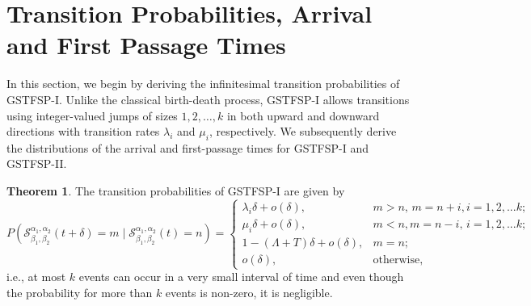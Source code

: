 \documentclass[11pt,oneside,reqno]{amsart}
\theoremstyle{definition}
\newtheorem{theorem}{\bf Theorem}[section]
\theoremstyle{remarkstyle}
\begin{document}
\section{Transition Probabilities, Arrival and First Passage Times}\label{sec 5}
In this section, we begin by deriving the infinitesimal transition probabilities of GSTFSP-I. Unlike the classical birth-death process, GSTFSP-I allows transitions using integer-valued jumps of sizes $1,2,\ldots,k$ in both upward and downward directions with transition rates $\lambda_i$ and $\mu_i$, respectively. We subsequently derive the distributions of the arrival and first-passage times for GSTFSP-I and GSTFSP-II.
\begin{theorem}\label{transition_gstfsp}
    The transition probabilities of GSTFSP-I are given by
\begin{equation*}
    P(\mathcal{S}_{\beta_1,\beta_2}^{\alpha_1,\alpha_2}(t+\delta)=m\mid\mathcal{S}_{\beta_1,\beta_2}^{\alpha_1,\alpha_2}(t)=n)=\begin{cases}
        \lambda_i\delta+o(\delta), & m>n,\, m=n+i, i=1,2,...k;\\
        \mu_i\delta+o(\delta), & m<n, m=n-i,\, i=1,2,...k;\\
        1-(\Lambda+T)\delta+o(\delta), & m=n;\\
        o(\delta), & \text{otherwise},
    \end{cases}
\end{equation*}
i.e., at most $k$ events can occur in a very small interval of time and even though the probability for more than $k$ events is non-zero, it is negligible.
\end{theorem}
\end{document}
